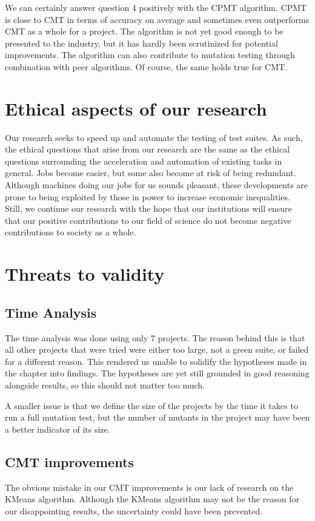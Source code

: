 \documentclass[twoside]{uva-inf-bachelor-thesis}
\begin{document}
We can certainly answer question 4 positively with the CPMT algorithm. CPMT is close to CMT in terms of accuracy on average and sometimes even outperforms CMT as a whole for a project. The algorithm is not yet good enough to be presented to the industry, but it has hardly been scrutinized for potential improvements. The algorithm can also contribute to mutation testing through combination with peer algorithms. Of course, the same holds true for CMT.

\section{Ethical aspects of our research}
Our research seeks to speed up and automate the testing of test suites. As such, the ethical questions that arise from our research are the same as the ethical questions surrounding the acceleration and automation of existing tasks in general. Jobs become easier, but some also become at risk of being redundant. Although machines doing our jobs for us sounds pleasant, these developments are prone to being exploited by those in power to increase economic inequalities. Still, we continue our research with the hope that our institutions will ensure that our positive contributions to our field of science do not become negative contributions to society as a whole.

\section{Threats to validity}
\subsection{Time Analysis}
The time analysis was done using only 7 projects. The reason behind this is that all other projects that were tried were either too large, not a green suite, or failed for a different reason. This rendered us unable to solidify the hypotheses made in the chapter into findings. The hypotheses are yet still grounded in good reasoning alongside results, so this should not matter too much.

A smaller issue is that we define the size of the projects by the time it takes to run a full mutation test, but the number of mutants in the project may have been a better indicator of its size.

\subsection{CMT improvements}
The obvious mistake in our CMT improvements is our lack of research on the KMeans algorithm. Although the KMeans algorithm may not be the reason for our disappointing results, the uncertainty could have been prevented.
\end{document}
